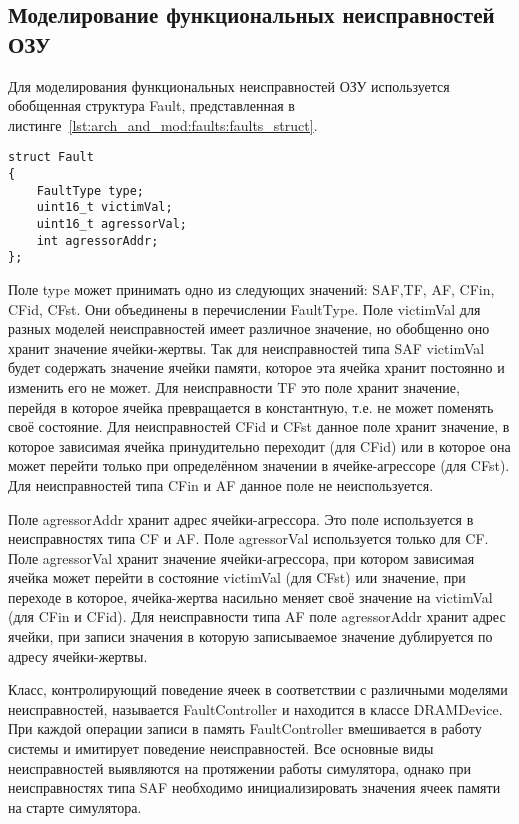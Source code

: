 \subsection{Моделирование функциональных неисправностей ОЗУ}
\label{sub:arch_and_mod:faults}
Для моделирования функциональных неисправностей ОЗУ используется обобщенная структура Fault, представленная в листинге~\ref{lst:arch_and_mod:faults:faults_struct}. 
\begin{lstlisting}[style=cplusplusstyle, caption={Структура описания функциональной неисправности ОЗУ}, label=lst:arch_and_mod:faults:faults_struct]
struct Fault
{
    FaultType type;
    uint16_t victimVal;
    uint16_t agressorVal;
    int agressorAddr;
};
\end{lstlisting} 

Поле type может принимать одно из следующих значений: SAF,TF, AF, CFin, CFid, CFst. Они объединены в перечислении FaultType. Поле victimVal для разных моделей неисправностей имеет различное значение, но обобщенно оно хранит значение ячейки-жертвы. Так для неисправностей типа SAF victimVal будет содержать значение ячейки памяти, которое эта ячейка хранит постоянно и изменить его не может. Для неисправности TF это поле хранит значение, перейдя в которое ячейка превращается в константную, т.е. не может поменять своё состояние. Для неисправностей CFid и CFst данное поле хранит значение, в которое зависимая ячейка принудительно переходит (для CFid) или в которое она может перейти только при определённом значении в ячейке-агрессоре (для CFst). Для неисправностей типа CFin и AF данное поле не неиспользуется. 

Поле agressorAddr хранит адрес ячейки-агрессора. Это поле используется в неисправностях типа CF и AF. Поле agressorVal используется только для CF. Поле agressorVal хранит значение ячейки-агрессора, при котором зависимая ячейка может перейти в состояние victimVal (для CFst) или значение, при переходе в которое, ячейка-жертва насильно меняет своё значение на victimVal (для CFin и CFid). Для неисправности типа AF поле agressorAddr хранит адрес ячейки, при записи значения в которую записываемое значение дублируется по адресу ячейки-жертвы.

Класс, контролирующий поведение ячеек в соответствии с различными моделями неисправностей, называется FaultController и находится в классе DRAMDevice. При каждой операции записи в память FaultController вмешивается в работу системы и имитирует поведение неисправностей. Все основные виды неисправностей выявляются на протяжении работы симулятора, однако при неисправностях типа SAF необходимо инициализировать значения ячеек памяти на старте симулятора. 


